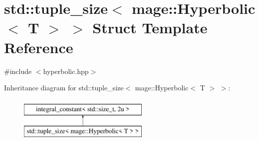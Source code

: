 \hypertarget{structstd_1_1tuple__size_3_01mage_1_1_hyperbolic_3_01_t_01_4_01_4}{}\section{std\+:\+:tuple\+\_\+size$<$ mage\+:\+:Hyperbolic$<$ T $>$ $>$ Struct Template Reference}
\label{structstd_1_1tuple__size_3_01mage_1_1_hyperbolic_3_01_t_01_4_01_4}


{\ttfamily \#include $<$hyperbolic.\+hpp$>$}

Inheritance diagram for std\+:\+:tuple\+\_\+size$<$ mage\+:\+:Hyperbolic$<$ T $>$ $>$\+:\begin{figure}[H]
\begin{center}
\leavevmode
\includegraphics[height=2.000000cm]{structstd_1_1tuple__size_3_01mage_1_1_hyperbolic_3_01_t_01_4_01_4}
\end{center}
\end{figure}
